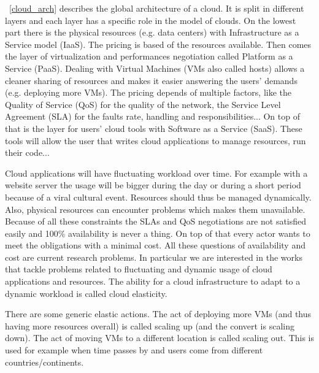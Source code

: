 \documentclass[a4paper, onecolumn]{article}
\begin{document}
  \figurename~\ref{cloud_arch} describes the global architecture of a cloud. It
  is split in different layers and each layer has a specific role in the model
  of clouds. On the lowest part there is the physical resources (e.g. data
  centers) with Infrastructure as a Service model (IaaS). The pricing is based
  of the resources available. Then comes the layer of virtualization and
  performances negotiation called Platform as a Service (PaaS). Dealing with
  Virtual Machines (VMs also called hosts) allows a cleaner sharing of resources
  and makes it easier answering the users' demands (e.g. deploying more VMs).
  The pricing depends of multiple factors, like the Quality of Service (QoS) for
  the quality of the network, the Service Level Agreement (SLA) for the faults
  rate, handling and responsibilities... On top of that is the layer for users'
  cloud tools with Software as a Service (SaaS). These tools will allow the user
  that writes cloud applications to manage resources, run their code...
  
  Cloud applications will have fluctuating workload over time. For example with
  a website server the usage will be bigger during the day or during a short
  period because of a viral cultural event. Resources should thus be managed
  dynamically. Also, physical resources can encounter problems which makes them
  unavailable. Because of all these constraints the SLAs and QoS negotiations
  are not satisfied easily and 100\% availability is never a thing. On top of
  that every actor wants to meet the obligations with a minimal cost. All these
  questions of availability and cost are current research problems. In
  particular we are interested in the works that tackle problems related to
  fluctuating and dynamic usage of cloud applications and resources. The ability
  for a cloud infrastructure to adapt to a dynamic workload is called cloud
  elasticity.
  
  
  There are some generic elastic actions. The act of deploying more VMs (and
  thus having more resources overall) is called scaling up (and the convert is
  scaling down). The act of moving VMs to a different location is called scaling
  out. This is used for example when time passes by and users come from
  different countries/continents.
  
  
\end{document}
